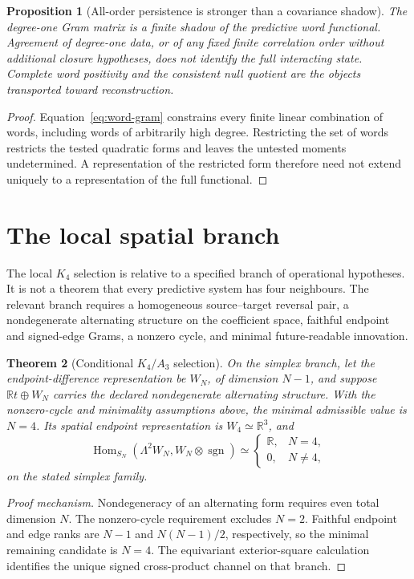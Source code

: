 \documentclass[11pt,a4paper,oneside]{book}
\theoremstyle{plain}
\newtheorem{theorem}{Theorem}[chapter]
\newtheorem{proposition}[theorem]{Proposition}
\theoremstyle{definition}
\theoremstyle{remark}
\newcommand{\R}{\mathbb R}
\newcommand{\sgn}{\operatorname{sgn}}
\newcommand{\Hom}{\operatorname{Hom}}
\newcommand{\src}[2]{\cite{#1}}
\begin{document}
\begin{proposition}[All-order persistence is stronger than a covariance shadow]
The degree-one Gram matrix is a finite shadow of the predictive word functional. Agreement of degree-one data, or of any fixed finite correlation order without additional closure hypotheses, does not identify the full interacting state. Complete word positivity and the consistent null quotient are the objects transported toward reconstruction.
\end{proposition}
\begin{proof}
Equation~\eqref{eq:word-gram} constrains every finite linear combination of words, including words of arbitrarily high degree. Restricting the set of words restricts the tested quadratic forms and leaves the untested moments undetermined. A representation of the restricted form therefore need not extend uniquely to a representation of the full functional.
\end{proof}
\cite{GT}

\section{The local spatial branch}
The local $K_4$ selection is relative to a specified branch of operational hypotheses. It is not a theorem that every predictive system has four neighbours. The relevant branch requires a homogeneous source--target reversal pair, a nondegenerate alternating structure on the coefficient space, faithful endpoint and signed-edge Grams, a nonzero cycle, and minimal future-readable innovation.

\begin{theorem}[Conditional $K_4/A_3$ selection]
\label{thm:k4}
On the simplex branch, let the endpoint-difference representation be $W_N$, of dimension $N-1$, and suppose $\R t\oplus W_N$ carries the declared nondegenerate alternating structure. With the nonzero-cycle and minimality assumptions above, the minimal admissible value is $N=4$. Its spatial endpoint representation is $W_4\simeq\R^3$, and
\begin{equation}
 \Hom_{S_N}\!\left(\Lambda^2W_N,W_N\otimes\sgn\right)
 \simeq
 \begin{cases}\R,&N=4,\\0,&N\ne4,\end{cases}
 \label{eq:k4-cross}
\end{equation}
on the stated simplex family.
\end{theorem}
\begin{proof}[Proof mechanism]
Nondegeneracy of an alternating form requires even total dimension $N$. The nonzero-cycle requirement excludes $N=2$. Faithful endpoint and edge ranks are $N-1$ and $N(N-1)/2$, respectively, so the minimal remaining candidate is $N=4$. The equivariant exterior-square calculation identifies the unique signed cross-product channel on that branch.
\end{proof}
\src{GT}{thm:dimension-K4-selector}
\end{document}
